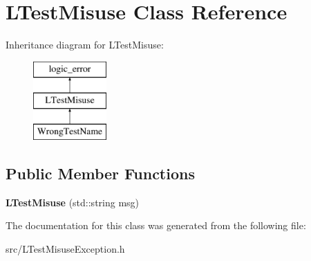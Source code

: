 \hypertarget{class_l_test_misuse}{\section{L\-Test\-Misuse Class Reference}
\label{class_l_test_misuse}
}
Inheritance diagram for L\-Test\-Misuse\-:\begin{figure}[H]
\begin{center}
\leavevmode
\includegraphics[height=3.000000cm]{class_l_test_misuse}
\end{center}
\end{figure}
\subsection*{Public Member Functions}
\begin{DoxyCompactItemize}
\item 
\hypertarget{class_l_test_misuse_ab43837938a604244d298e256ecd9cb2f}{{\bfseries L\-Test\-Misuse} (std\-::string msg)}\label{class_l_test_misuse_ab43837938a604244d298e256ecd9cb2f}

\end{DoxyCompactItemize}


The documentation for this class was generated from the following file\-:\begin{DoxyCompactItemize}
\item 
src/L\-Test\-Misuse\-Exception.\-h\end{DoxyCompactItemize}
